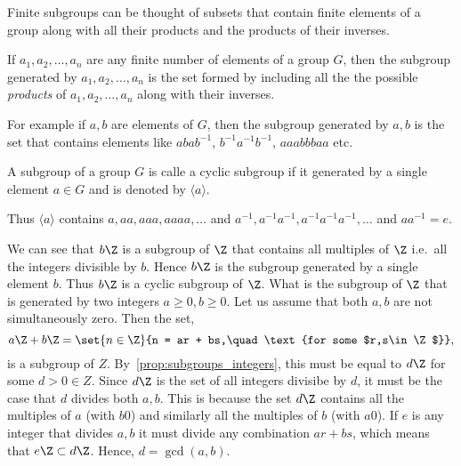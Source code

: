 Finite subgroups can be
thought of subsets that contain finite elements of a group along with all their products and the
products of their inverses.

\begin{Definition}
    If $a_1,a_2,\ldots,a_n$ are any finite number of elements of a group $G$, then the subgroup
    generated by $a_1,a_2,\ldots,a_n$ is the set formed by including all the the possible
    \emph{products} of $a_1,a_2,\ldots,a_n$ along with their inverses.
\end{Definition}
For example if $a,b$ are elements of $G$, then the subgroup generated by $a,b$ is the set that
contains elements like $abab^{-1}$, $b^{-1}a^{-1}b^{-1}$, $aaabbbaa$ etc. 

\begin{Definition}
    A subgroup of a group $G$ is calle a cyclic subgroup if it generated by a single element $a \in
    G$ and is denoted by $\langle a \rangle$.
\end{Definition}
Thus $\langle a \rangle$ contains $a,aa,aaa,aaaa,\ldots$ and
$a^{-1},a^{-1}a^{-1},a^{-1}a^{-1}a^{-1},\ldots$ and $aa^{-1} = e$.

We can see that $b\Z$ is a subgroup of $\Z$ that
contains all multiples of $\Z$ i.e.~all the integers divisible by $b$. 
Hence $b\Z$ is the subgroup generated by a single element $b$. Thus $b\Z$ is a
cyclic subgroup of $\Z$. What is the subgroup of $\Z$ that is generated by two integers $a \geq 0,b\geq 0$.
Let us assume that both $a,b$ are not simultaneously zero. Then the set,
\[a\Z + b\Z = \set{n\in\Z}{n = ar + bs,\quad\text{for some $r,s\in\Z$}},\]
is a subgroup of $Z$. By~\ref{prop:subgroups_integers}, this must be equal to $d\Z$ for some $d > 0 \in Z$.
Since $d\Z$ is the set of all integers divisibe by $d$, it must be the case that $d$ divides both $a,b$. This
is because the set $d\Z$ contains all the multiples of $a$ (with $b0$) and similarly all the multiples of $b$
(with $a0$). If $e$ is any integer that divides $a,b$ it must divide any combination $ar + bs$, which means
that $e\Z \subset d\Z$. Hence, $d = \gcd(a,b)$.

